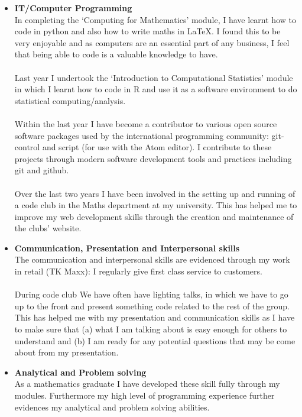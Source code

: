 \documentclass[a4paper]{res}
\begin{document}
\begin{resume}
\begin{itemize}
\item \textbf{IT/Computer Programming} \\
In completing the ‘Computing for Mathematics’ module, I have learnt how to code
in python and also how to write maths in LaTeX. I found this to be very
enjoyable and as computers are an essential part of any business, I feel that
being able to code is a valuable knowledge to have. \\
\\
Last year I undertook the ‘Introduction to Computational Statistics’ module in
which I learnt how to code in R and use it as a software environment to do
statistical computing/analysis. \\
\\
Within the last year I have become a contributor to various open source software
packages used by the international programming community: git-control and script
(for use with the Atom editor). I contribute to these projects through modern
software development tools and practices including git and github. \\
\\
Over the last two years I have been involved in the setting up and running of a
code club in the Maths department at my university. This has helped me to
improve my web development skills through the creation and maintenance of the
clubs' website. \\

\item \textbf{Communication, Presentation and Interpersonal skills} \\
The communication and interpersonal skills are evidenced through my work in
retail (TK Maxx): I regularly give first class service to customers.\\
\\
During code club We have often have lighting talks, in which we have to go
up to the front and present something code related to the rest of the group.
This has helped me with my presentation and communication skills as I have to
make sure that (a) what I am talking about is easy enough for others to
understand and (b) I am ready for any potential questions that may be come about
from my presentation. \\

\item \textbf{Analytical and Problem solving} \\
As a mathematics graduate I have developed these skill fully through my
modules. Furthermore my high level of programming experience further
evidences my analytical and problem solving abilities.\\


\end{itemize}
\end{resume}
\end{document}
